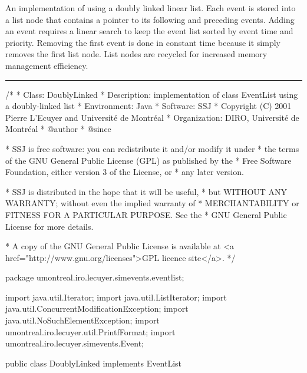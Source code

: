 
An implementation of  using a doubly linked linear list.
Each event is stored into a list node that contains a pointer to its following
and preceding events.  Adding an event requires a linear search to keep the
event list sorted by event time and priority. Removing the first event is
done in constant time because it simply removes the first list node.
List nodes are recycled for increased memory management efficiency.

\bigskip\hrule

\begin{code}
\begin{hide}
/*
 * Class:        DoublyLinked
 * Description:  implementation of class EventList using a doubly-linked list
 * Environment:  Java
 * Software:     SSJ 
 * Copyright (C) 2001  Pierre L'Ecuyer and Université de Montréal
 * Organization: DIRO, Université de Montréal
 * @author       
 * @since

 * SSJ is free software: you can redistribute it and/or modify it under
 * the terms of the GNU General Public License (GPL) as published by the
 * Free Software Foundation, either version 3 of the License, or
 * any later version.

 * SSJ is distributed in the hope that it will be useful,
 * but WITHOUT ANY WARRANTY; without even the implied warranty of
 * MERCHANTABILITY or FITNESS FOR A PARTICULAR PURPOSE.  See the
 * GNU General Public License for more details.

 * A copy of the GNU General Public License is available at
   <a href="http://www.gnu.org/licenses">GPL licence site</a>.
 */
\end{hide}
package umontreal.iro.lecuyer.simevents.eventlist; \begin{hide}
import java.util.Iterator;
import java.util.ListIterator;
import java.util.ConcurrentModificationException;
import java.util.NoSuchElementException;
import umontreal.iro.lecuyer.util.PrintfFormat;
import umontreal.iro.lecuyer.simevents.Event;
\end{hide}

public class DoublyLinked implements EventList\begin{hide} {
   private int modCount = 0;

   // First and last elements in the list.
   private Node first = null, last = null;
   private static Node free = null;     // Pointer to stack of free nodes.
\end{hide}
\end{code}\begin{hide}\begin{code}


\end{code}
\end{hide}
